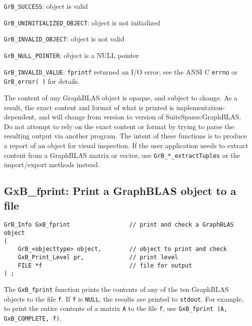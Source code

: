 \documentclass[12pt]{article}
\newenvironment{packed_itemize}{
\begin{itemize}
  \setlength{\itemsep}{1pt}
  \setlength{\parskip}{0pt}
  \setlength{\parsep}{0pt}
}{\end{itemize}}
\begin{document}
\begin{packed_itemize}
\item \verb'GrB_SUCCESS':               object is valid
\item \verb'GrB_UNINITIALIZED_OBJECT':  object is not initialized
\item \verb'GrB_INVALID_OBJECT':        object is not valid
\item \verb'GrB_NULL_POINTER':          object is a NULL pointer
\item \verb'GrB_INVALID_VALUE':         \verb'fprintf' returned an I/O error;
    see the ANSI C \verb'errno' or \verb'GrB_error( )' for details.
\end{packed_itemize}

The content of any GraphBLAS object is opaque, and subject to change.  As a
result, the exact content and format of what is printed is
implementation-dependent, and will change from version to version of
SuiteSparse:GraphBLAS.  Do not attempt to rely on the exact content or format
by trying to parse the resulting output via another program.  The intent of
these functions is to produce a report of an object for visual inspection.  If
the user application needs to extract content from a GraphBLAS matrix or
vector, use \verb'GrB_*_extractTuples' or the import/export methods instead.

\newpage
\subsection{{\sf GxB\_fprint:} Print a GraphBLAS object to a file} %

\begin{mdframed}[userdefinedwidth=6in]
{\footnotesize
\begin{verbatim}
GrB_Info GxB_fprint                 // print and check a GraphBLAS object
(
    GrB_<objecttype> object,        // object to print and check
    GxB_Print_Level pr,             // print level
    FILE *f                         // file for output
) ;
\end{verbatim} } \end{mdframed}

The \verb'GxB_fprint' function prints the contents of any of the ten GraphBLAS
objects to the file \verb'f'.  If \verb'f' is \verb'NULL', the results are
printed to \verb'stdout'.  For example, to print the entire contents of a
matrix \verb'A' to the file \verb'f', use
\verb'GxB_fprint (A, GxB_COMPLETE, f)'.
\end{document}
